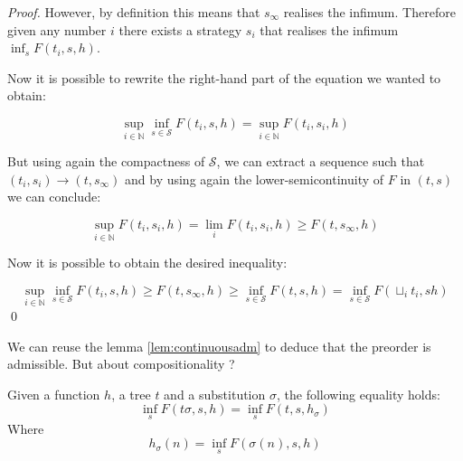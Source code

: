 \begin{ensps}
\begin{proof}
    However, by definition this means that 
    $s_\infty$ realises the infimum. Therefore given any 
    number $i$ there exists a strategy $s_i$ that realises 
    the infimum $\inf_s F(t_i, s, h)$.

    Now it is possible to rewrite the right-hand part 
    of the equation we wanted to obtain:

    \begin{equation*}
        \sup_{i \in \mathbb{N}} \inf_{s \in \mathcal{S}} F(t_i,s,h) 
        = 
        \sup_{i \in \mathbb{N}}  F(t_i,s_i,h)
    \end{equation*}

    But using again the compactness of $\mathcal{S}$, we can 
    extract a sequence such that $(t_i,s_i) \longrightarrow (t,s_\infty)$
    and by using again the lower-semicontinuity of $F$ in $(t,s)$ we can 
    conclude:

    \begin{equation*}
        \sup_{i \in \mathbb{N}}  F(t_i,s_i,h) = \lim_i F(t_i, s_i, h) \geq
        F(t,s_\infty, h)
    \end{equation*}

    Now it is possible to obtain the desired inequality:

    \begin{equation*}
        \sup_{i \in \mathbb{N}} \inf_{s \in \mathcal{S}} F(t_i,s,h) 
        \geq 
        F(t,s_\infty, h)
        \geq 
        \inf_{s \in \mathcal{S}} F(t,s,h)
        = 
        \inf_{s \in \mathcal{S}} F (\sqcup_i t_i, s h)
    \end{equation*}
    \qed
\end{proof}
\end{ensps}

We can reuse the lemma \ref{lem:continuousadm} to deduce 
that the preorder is admissible. But about compositionality ?

\begin{alemma}[Decomposition]
    \label{lem:mixeddecomposition}
    Given a function $h$, a tree $t$ and a substitution $\sigma$,
    the following equality holds:
    \begin{equation*}
        \inf_s F(t\sigma ,s,h) = \inf_s F(t,s,h_\sigma)
    \end{equation*}
    Where
    \begin{equation*}
        h_\sigma (n) = \inf_s F(\sigma(n),s,h)
    \end{equation*}
\end{alemma}

